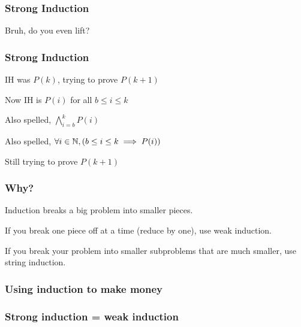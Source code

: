 \begin{frame}
  \frametitle{Strong Induction}
  \pause
  {\large Bruh, do you even lift?}
\end{frame}

\begin{frame}
  \frametitle{Strong Induction}
  IH was $P(k)$, trying to prove $P(k+1)$
  \pause

  Now IH is $P(i)$ for all $b \leq i \leq k$
  \pause

  Also spelled, $\bigwedge_{i=b}^k P(i)$
  \pause

  Also spelled, $\forall i \in \mathbb{N}, (b \leq i \leq k \implies P(i))$
  \pause

  Still trying to prove $P(k+1)$
\end{frame}

\begin{frame}
  \frametitle{Why?}
  Induction breaks a big problem into smaller pieces.

  If you break one piece off at a time (reduce by one), use weak induction.

  If you break your problem into smaller subproblems that are much smaller, use string induction.
\end{frame}

\begin{frame}
  \frametitle{Using induction to make money}
\end{frame}

\begin{frame}
  \frametitle{Strong induction = weak induction}
\end{frame}

